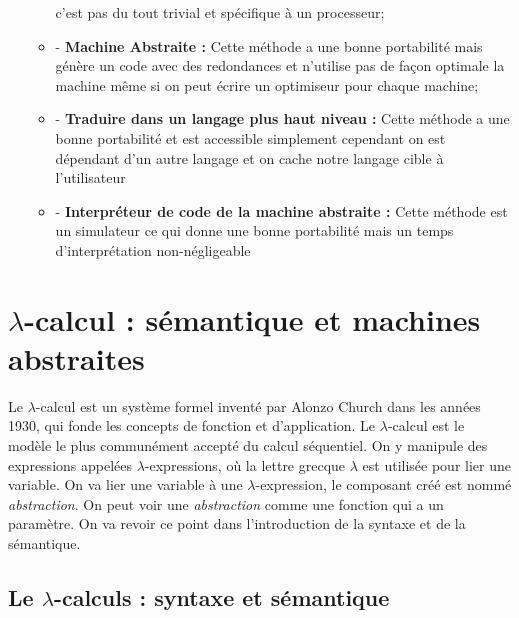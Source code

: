 \documentclass[10pt,a4paper]{report}
\begin{document}
\begin{itemize}
\begin{itemize}
		c'est pas du tout trivial et spécifique à un processeur;
		\item[] - \textbf{Machine Abstraite :} Cette méthode a une bonne portabilité mais génère un code avec des redondances et n'utilise pas de
		façon optimale la machine même si on peut écrire un optimiseur pour chaque machine;
		\item[] - \textbf{Traduire dans un langage plus haut niveau :} Cette méthode a une bonne portabilité et est accessible simplement cependant
		on est dépendant d'un autre langage et on cache notre langage cible à l'utilisateur
		\item[] - \textbf{Interpréteur de code de la machine abstraite :} Cette méthode est un simulateur ce qui donne une bonne portabilité mais un
		temps d'interprétation non-négligeable
	\end{itemize}
\end{itemize}
	\newpage
	
	
	
	\section{$\lambda$-calcul : sémantique et machines abstraites}
	
	Le $\lambda$-calcul est un système formel inventé par Alonzo Church dans les années 1930, qui fonde les concepts de fonction et
	d'application. Le $\lambda$-calcul est le modèle le plus communément accepté du calcul séquentiel. On y manipule des expressions appelées $\lambda$-expressions, où la lettre grecque $\lambda$ est utilisée pour lier une variable. On va lier une variable à une $\lambda$-expression, le composant créé est nommé \textit{abstraction}. On peut voir une \textit{abstraction} comme une fonction qui a un paramètre. On va revoir ce point dans l'introduction de la syntaxe et de la sémantique.
	\subsection{Le $\lambda$-calculs : syntaxe et sémantique}
	
\end{document}
